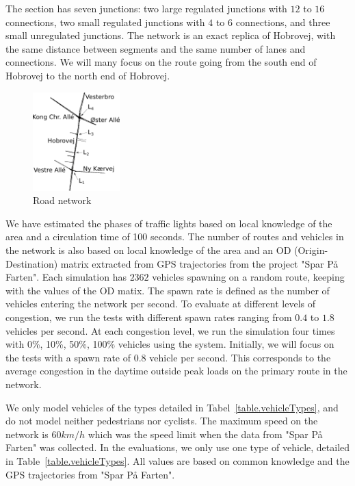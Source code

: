 The section has seven junctions: two large regulated junctions with $12$ to $16$ connections, two small regulated junctions with $4$ to $6$ connections, and three small unregulated junctions.
The network is an exact replica of Hobrovej, with the same distance between segments and the same number of lanes and connections.
We will many focus on the route going from the south end of Hobrovej to the north end of Hobrovej.
\begin{figure}[htb]
\centering
\includegraphics[width=0.3\textwidth]{../images/HobrovejNy.png}
\caption{Road network}
\label{fig:Introduction:hobro}
\end{figure}

We have estimated the phases of traffic lights based on local knowledge of the area and a circulation time of 100 seconds.
The number of routes and vehicles in the network is also based on local knowledge of the area and an OD (Origin-Destination) matrix extracted from GPS trajectories from the project "Spar På Farten"\cite{SparPaFarten}.
Each simulation has $2362$ vehicles spawning on a random route, keeping with the values of the OD matix.
The spawn rate is defined as the number of vehicles entering the network per second.
To evaluate \tech at different levels of congestion, we run the tests with different spawn rates ranging from $0.4$ to $1.8$ vehicles per second.
At each congestion level, we run the simulation four times with 0\%, 10\%, 50\%, 100\% vehicles using the system.
Initially, we will focus on the tests with a spawn rate of $0.8$ vehicle per second. %
This corresponds to the average congestion in the daytime outside peak loads on the primary route in the network.

We only model vehicles of the types detailed in Tabel~\ref{table.vehicleTypes}, and do not model neither pedestrians nor cyclists.
The maximum speed on the network is $60km/h$ which was the speed limit when the data from "Spar På Farten" was collected.
In the evaluations, we only use one type of vehicle, detailed in Table~\ref{table.vehicleTypes}. 
All values are based on common knowledge and the GPS trajectories from "Spar På Farten".

